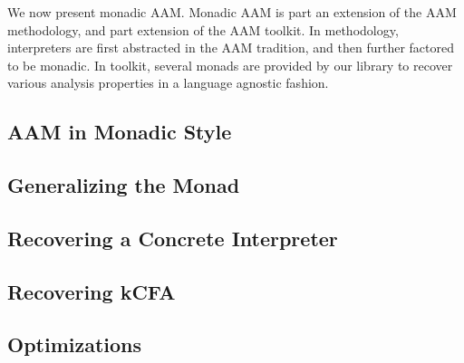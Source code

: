 We now present monadic AAM.
%
Monadic AAM is part an extension of the AAM methodology, and part extension of
the AAM toolkit.
%
In methodology, interpreters are first abstracted in the AAM tradition, and
then further factored to be monadic.
%
In toolkit, several monads are provided by our library to recover various
analysis properties in a language agnostic fashion.

\subsection{AAM in Monadic Style}
\label{section:MonadicAAM:00}


\subsection{Generalizing the Monad}
\label{section:MonadicAAM:01}


\subsection{Recovering a Concrete Interpreter}
\label{section:MonadicAAM:02}


\subsection{Recovering kCFA}
\label{section:MonadicAAM:03}


\subsection{Optimizations}
\label{section:MonadicAAM:04}

